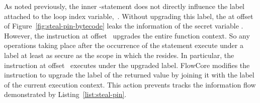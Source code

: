 As noted previously, the inner -statement does not directly influence the label attached to the loop index variable,~.
Without upgrading this label, the  at offset~ of Figure~\ref{fig:steal-pin-bytecode} leaks the information of the secret variable .
However, the \popj instruction at offset~ upgrades the entire function context.
So any operations taking place after the occurrence of the  statement execute under a label at least as secure as the scope in which the  resides.
In particular, the  instruction at offset~ executes under the upgraded label.
FlowCore modifies the  instruction to upgrade the label of the returned value by joining it with the label of the current execution context.
This action prevents tracks the information flow demonstrated by Listing~\ref{list:steal-pin}.




